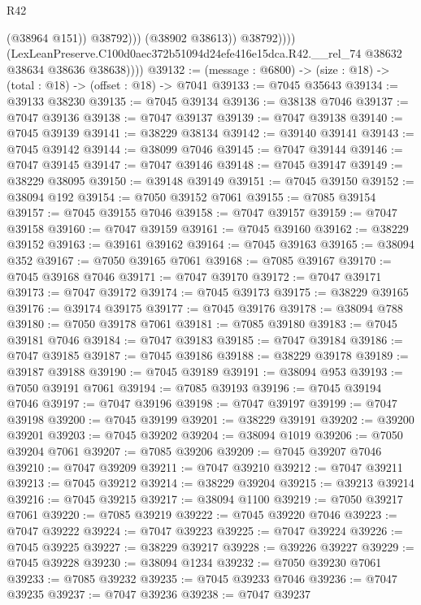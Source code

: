 \begin{lexlean}{R42}
\begin{coremodule}
{                            (@38964 @151))
                          @38792)))
                    (@38902 @38613))
                  @38792))))
          (LexLeanPreserve.C100d0aec372b51094d24efe416e15dca.R42.__rel_74
            @38632
            @38634
            @38636
            @38638))))
@39132 := (message : @6800) -> (size : @18) -> (total : @18) -> (offset : @18) -> @7041
@39133 := @7045 @35643
@39134 := @39133 @38230
@39135 := @7045 @39134
@39136 := @38138 @7046
@39137 := @7047 @39136
@39138 := @7047 @39137
@39139 := @7047 @39138
@39140 := @7045 @39139
@39141 := @38229 @38134
@39142 := @39140 @39141
@39143 := @7045 @39142
@39144 := @38099 @7046
@39145 := @7047 @39144
@39146 := @7047 @39145
@39147 := @7047 @39146
@39148 := @7045 @39147
@39149 := @38229 @38095
@39150 := @39148 @39149
@39151 := @7045 @39150
@39152 := @38094 @192
@39154 := @7050 @39152 @7061
@39155 := @7085 @39154
@39157 := @7045 @39155 @7046
@39158 := @7047 @39157
@39159 := @7047 @39158
@39160 := @7047 @39159
@39161 := @7045 @39160
@39162 := @38229 @39152
@39163 := @39161 @39162
@39164 := @7045 @39163
@39165 := @38094 @352
@39167 := @7050 @39165 @7061
@39168 := @7085 @39167
@39170 := @7045 @39168 @7046
@39171 := @7047 @39170
@39172 := @7047 @39171
@39173 := @7047 @39172
@39174 := @7045 @39173
@39175 := @38229 @39165
@39176 := @39174 @39175
@39177 := @7045 @39176
@39178 := @38094 @788
@39180 := @7050 @39178 @7061
@39181 := @7085 @39180
@39183 := @7045 @39181 @7046
@39184 := @7047 @39183
@39185 := @7047 @39184
@39186 := @7047 @39185
@39187 := @7045 @39186
@39188 := @38229 @39178
@39189 := @39187 @39188
@39190 := @7045 @39189
@39191 := @38094 @953
@39193 := @7050 @39191 @7061
@39194 := @7085 @39193
@39196 := @7045 @39194 @7046
@39197 := @7047 @39196
@39198 := @7047 @39197
@39199 := @7047 @39198
@39200 := @7045 @39199
@39201 := @38229 @39191
@39202 := @39200 @39201
@39203 := @7045 @39202
@39204 := @38094 @1019
@39206 := @7050 @39204 @7061
@39207 := @7085 @39206
@39209 := @7045 @39207 @7046
@39210 := @7047 @39209
@39211 := @7047 @39210
@39212 := @7047 @39211
@39213 := @7045 @39212
@39214 := @38229 @39204
@39215 := @39213 @39214
@39216 := @7045 @39215
@39217 := @38094 @1100
@39219 := @7050 @39217 @7061
@39220 := @7085 @39219
@39222 := @7045 @39220 @7046
@39223 := @7047 @39222
@39224 := @7047 @39223
@39225 := @7047 @39224
@39226 := @7045 @39225
@39227 := @38229 @39217
@39228 := @39226 @39227
@39229 := @7045 @39228
@39230 := @38094 @1234
@39232 := @7050 @39230 @7061
@39233 := @7085 @39232
@39235 := @7045 @39233 @7046
@39236 := @7047 @39235
@39237 := @7047 @39236
@39238 := @7047 @39237
}
\end{coremodule}
\end{lexlean}

